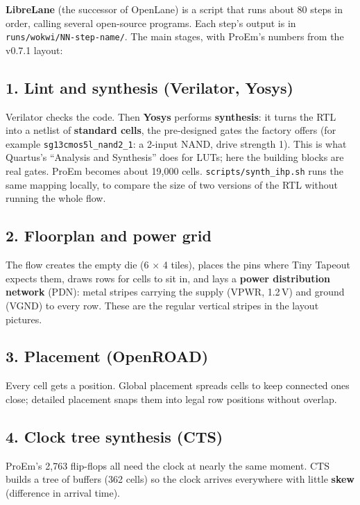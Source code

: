 \documentclass[11pt,a4paper]{article}
\newcommand{\file}[1]{\texttt{#1}}
\begin{document}
\textbf{LibreLane} (the successor of OpenLane) is a script that runs about 80 steps in order, calling several open-source programs. Each step's output is in \file{runs/wokwi/NN-step-name/}. The main stages, with ProEm's numbers from the v0.7.1 layout:

\subsection{1. Lint and synthesis (Verilator, Yosys)}

Verilator checks the code. Then \textbf{Yosys} performs \textbf{synthesis}: it turns the RTL into a netlist of \textbf{standard cells}, the pre-designed gates the factory offers (for example \texttt{sg13cmos5l\_nand2\_1}: a 2-input NAND, drive strength 1). This is what Quartus's ``Analysis and Synthesis'' does for LUTs; here the building blocks are real gates. ProEm becomes about 19,000 cells. \file{scripts/synth\_ihp.sh} runs the same mapping locally, to compare the size of two versions of the RTL without running the whole flow.

\subsection{2. Floorplan and power grid}

The flow creates the empty die (6 $\times$ 4 tiles), places the pins where Tiny Tapeout expects them, draws rows for cells to sit in, and lays a \textbf{power distribution network} (PDN): metal stripes carrying the supply (VPWR, 1.2\,V) and ground (VGND) to every row. These are the regular vertical stripes in the layout pictures.

\subsection{3. Placement (OpenROAD)}

Every cell gets a position. Global placement spreads cells to keep connected ones close; detailed placement snaps them into legal row positions without overlap.

\subsection{4. Clock tree synthesis (CTS)}

ProEm's 2,763 flip-flops all need the clock at nearly the same moment. CTS builds a tree of buffers (362 cells) so the clock arrives everywhere with little \textbf{skew} (difference in arrival time).
\end{document}
